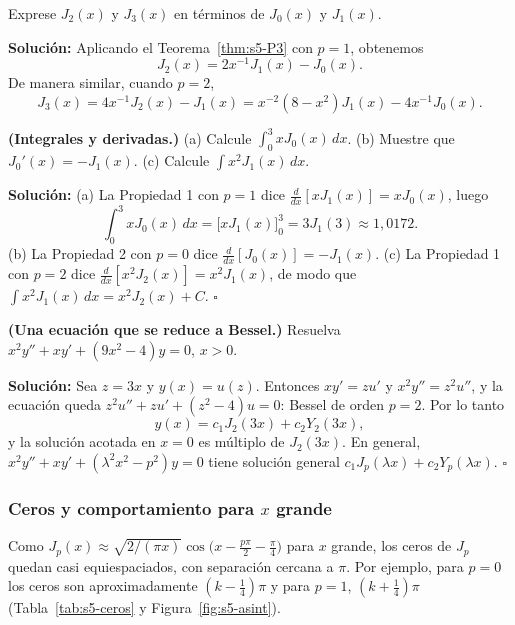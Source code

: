 \begin{example}\label{ex:s5-J2J3}
  Exprese $J_2(x)$ y $J_3(x)$ en términos de $J_0(x)$ y $J_1(x)$.
 
\noindent \textbf{Solución:} \quad Aplicando el Teorema~\ref{thm:s5-P3} con $p = 1$, obtenemos
\[ J_2(x) = 2x^{-1}J_1(x) - J_0(x). \]
De manera similar, cuando $p = 2$,
\[ J_3(x) = 4x^{-1}J_2(x) - J_1(x) = x^{-2}(8 - x^2)J_1(x) - 4x^{-1}J_0(x). \tag*{$\square$} \]
\end{example}
 
\begin{example}\label{ex:s5-integral}
\textbf{(Integrales y derivadas.)} (a) Calcule $\displaystyle\int_0^3 xJ_0(x)\,dx$. (b) Muestre que $J_0'(x)=-J_1(x)$. (c) Calcule $\displaystyle\int x^2J_1(x)\,dx$.
 
\noindent \textbf{Solución:} \quad (a) La Propiedad 1 con $p=1$ dice $\frac{d}{dx}[xJ_1(x)]=xJ_0(x)$, luego
\[ \int_0^3xJ_0(x)\,dx=\bigl[xJ_1(x)\bigr]_0^3=3J_1(3)\approx1{,}0172. \]
(b) La Propiedad 2 con $p=0$ dice $\frac{d}{dx}[J_0(x)]=-J_1(x)$. (c) La Propiedad 1 con $p=2$ dice $\frac{d}{dx}[x^2J_2(x)]=x^2J_1(x)$, de modo que $\int x^2J_1(x)\,dx=x^2J_2(x)+C$. \hfill $\square$
\end{example}
 
\begin{example}\label{ex:s5-parametrica}
\textbf{(Una ecuación que se reduce a Bessel.)} Resuelva $x^2y''+xy'+(9x^2-4)y=0$, $x>0$.
 
\noindent \textbf{Solución:} \quad Sea $z=3x$ y $y(x)=u(z)$. Entonces $xy'=zu'$ y $x^2y''=z^2u''$, y la ecuación queda $z^2u''+zu'+(z^2-4)u=0$: Bessel de orden $p=2$. Por lo tanto
\[ y(x)=c_1J_2(3x)+c_2Y_2(3x), \]
y la solución acotada en $x=0$ es múltiplo de $J_2(3x)$. En general, $x^2y''+xy'+(\lambda^2x^2-p^2)y=0$ tiene solución general $c_1J_p(\lambda x)+c_2Y_p(\lambda x)$. \hfill $\square$
\end{example}
 
\subsubsection*{Ceros y comportamiento para $x$ grande}
 
Como $J_p(x)\approx\sqrt{2/(\pi x)}\cos\bigl(x-\frac{p\pi}2-\frac\pi4\bigr)$ para $x$ grande, los ceros de $J_p$ quedan casi equiespaciados, con separación cercana a $\pi$. Por ejemplo, para $p=0$ los ceros son aproximadamente $(k-\tfrac14)\pi$ y para $p=1$, $(k+\tfrac14)\pi$ (Tabla~\ref{tab:s5-ceros} y Figura~\ref{fig:s5-asint}).
 
